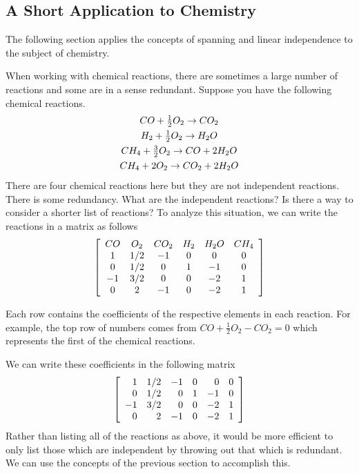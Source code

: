 \subsection{A Short Application to Chemistry}

The following section applies the concepts of spanning and linear independence to the subject of chemistry. 

When working with chemical reactions, there are sometimes a large number of reactions and some are in a sense redundant. Suppose you have the following chemical
reactions.
\begin{equation*}
\begin{array}{c}
CO+\vspace{0.05in}\frac{1}{2}O_{2}\rightarrow CO_{2} \\
H_{2}+\vspace{0.05in}\frac{1}{2}O_{2}\rightarrow H_{2}O \\
CH_{4}+\vspace{0.05in}\frac{3}{2}O_{2}\rightarrow CO+2H_{2}O \\
CH_{4}+2O_{2}\rightarrow CO_{2}+2H_{2}O
\end{array}
\end{equation*}
There are four chemical reactions here but they are not independent
reactions. There is some redundancy. What are the independent reactions? Is
there a way to consider a shorter list of reactions? To analyze this
situation, we can write the reactions in a matrix as follows
\begin{equation*}
\left[
\begin{array}{cccccc}
CO & O_{2} & CO_{2} & H_{2} & H_{2}O & CH_{4} \\
1 & 1/2 & -1 & 0 & 0 & 0 \\
0 & 1/2 & 0 & 1 & -1 & 0 \\
-1 & 3/2 & 0 & 0 & -2 & 1 \\
0 & 2 & -1 & 0 & -2 & 1
\end{array}
\right]
\end{equation*}

Each row contains the coefficients of the respective elements in each reaction. For example, the top row of numbers comes from $CO+\frac{1}{2}O_{2}-CO_{2}=0$ which
represents the first of the chemical reactions. 

We can write these coefficients in the following matrix
\begin{equation*}
\left[
\begin{array}{rrrrrr}
1 & 1/2 & -1 & 0 & 0 & 0 \\
0 & 1/2 & 0 & 1 & -1 & 0 \\
-1 & 3/2 & 0 & 0 & -2 & 1 \\
0 & 2 & -1 & 0 & -2 & 1
\end{array}
\right]
\end{equation*}
Rather than listing all of the
reactions as above, it would be more efficient to only list those which are independent by throwing out that which is redundant. We can use the concepts of the previous section to accomplish this.

